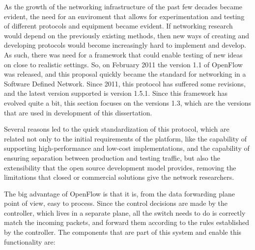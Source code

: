 As the growth of the networking infrastructure of the past few decades became evident, the need for an enviroment that allows for experimentation and testing of different protocols and equipment became evident. If networking 
research would depend on the previously existing methods, then new ways of creating and developing protocols would become increasingly hard to implement and develop. As such, there was need for a framework that could 
enable testing of new ideas on close to realistic settings. So, on February 2011 the version 1.1 of OpenFlow was released, and this proposal quickly became the standard for networking in a Software Defined Network. Since
2011, this protocol has suffered some revisions, and the latest version supported is version 1.5.1. Since this framework has evolved quite a bit, this section focuses on the versions 1.3, which are the versions that 
are used in development of this dissertation. 
\par Several reasons led to the quick standardization of this protocol, which are related not only to the initial requirements of the platform, like the capability of supporting high-performance and low-cost implementations, 
and the capability of ensuring separation between production and testing traffic, but also the extensibility that the open source development model provides, removing the limitations that closed or commercial solutions give the 
network researchers.
\par The big advantage of OpenFlow is that it is, from the data forwarding plane point of view, easy to process. Since the control decisions are made by the controller, which lives in a separate plane, all the switch needs to do
is correctly match the incoming packets, and forward them according to the rules established by the controller. The components that are part of this system and enable this functionality are:

